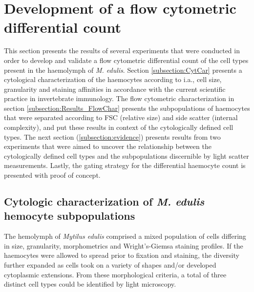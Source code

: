\section{Development of a flow cytometric differential count}
This section presents the results of several experiments that were conducted in order to develop and validate a flow cytometric differential count of the cell types present in the haemolymph of \emph{M. edulis}. Section \ref{subsection:CytCar} presents a cytological characterization of the haemocytes according to i.a., cell size, granularity and staining affinities in accordance with the current scientific practice in invertebrate immunology. The flow cytometric characterization in section \ref{subsection:Results_FlowChar} presents the subpopulations of haemocytes that were separated according to FSC (relative size) and side scatter (internal complexity), and put these results in context of the cytologically defined cell types. The next section (\ref{subsection:evidence}) presents results from two experiments that were aimed to uncover the relationship between the cytologically defined cell types and the subpopulations discernible by light scatter measurements. Lastly, the gating strategy for the differential haemocyte count is presented with proof of concept.

\subsection{Cytologic characterization of \emph{M. edulis} hemocyte subpopulations}
\label{subsection:Results_cytchar}
The hemolymph of \emph{Mytilus edulis} comprised a mixed population of cells differing in size, granularity, morphometrics and Wright's-Giemsa staining profiles. If the haemocytes were allowed to spread prior to fixation and staining, the diversity further expanded as cells took on a variety of shapes and/or developed cytoplasmic extensions. From these morphological criteria, a total of three distinct cell types could be identified by light microscopy.

